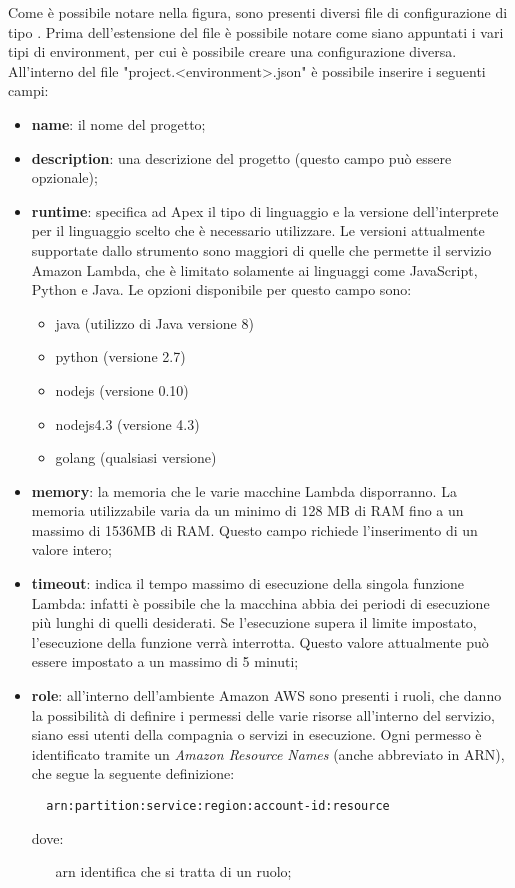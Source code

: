 Come è possibile notare nella figura, sono presenti diversi file di
configurazione di tipo . Prima
dell'estensione del file è possibile notare come siano appuntati i vari tipi di
environment, per cui è possibile creare una configurazione diversa.
All'interno del file "project.<environment>.json" è possibile inserire i
seguenti campi:
\begin{itemize}
  \item \textbf{name}: il nome del progetto;
  \item \textbf{description}: una descrizione del progetto (questo campo può
essere opzionale);
  \item \textbf{runtime}: specifica ad Apex il tipo di linguaggio e la versione
dell'interprete per il linguaggio scelto che è necessario utilizzare. Le
versioni attualmente supportate dallo strumento sono maggiori di quelle che
permette il servizio Amazon Lambda, che è limitato solamente ai linguaggi come
JavaScript, Python e Java. Le opzioni disponibile per questo campo sono:
  \begin{itemize}
    \item java (utilizzo di Java versione 8)
    \item python (versione 2.7)
    \item nodejs (versione 0.10)
    \item nodejs4.3 (versione 4.3)
    \item golang (qualsiasi versione)
  \end{itemize}

  \item \textbf{memory}: la memoria che le varie macchine Lambda disporranno.
La memoria utilizzabile varia da un minimo di 128 MB di RAM fino a un massimo
di 1536MB di RAM. Questo campo richiede l'inserimento di un valore intero;

  \item \textbf{timeout}: indica il tempo massimo di esecuzione della singola
funzione Lambda: infatti è possibile che la macchina abbia dei periodi di
esecuzione più lunghi di quelli desiderati. Se l'esecuzione supera il limite
impostato, l'esecuzione della funzione verrà interrotta. Questo valore
attualmente può essere impostato a un massimo di 5 minuti;

  \item \textbf{role}: all'interno dell'ambiente Amazon AWS sono presenti i
ruoli, che danno la possibilità di definire i permessi delle varie risorse
all'interno del servizio, siano essi utenti della compagnia o servizi in
esecuzione. Ogni permesso è identificato tramite un \textit{Amazon Resource
Names} (anche abbreviato in ARN), che segue la seguente definizione:
\begin{verbatim}
  arn:partition:service:region:account-id:resource
\end{verbatim}
dove:
  \begin{itemize}
    \item[arn] identifica che si tratta di un ruolo;


\end{itemize}
\end{itemize}
